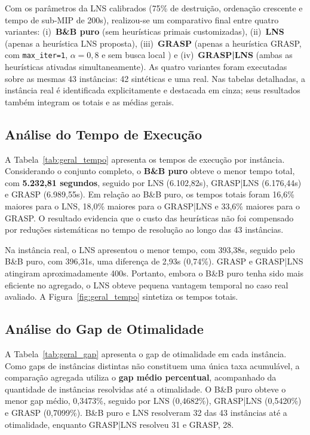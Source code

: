Com os parâmetros da LNS calibrados (75\% de destruição, ordenação crescente e tempo de sub-MIP de 200s), realizou-se um comparativo final entre quatro variantes: (i)~\textbf{B\&B puro} (sem heurísticas primais customizadas), (ii)~\textbf{LNS} (apenas a heurística LNS proposta), (iii)~\textbf{GRASP} (apenas a heurística GRASP, com \texttt{max\_iter=1}, $\alpha=0{,}8$ e sem busca local \cite{jhonatan_grasp_dpd}) e (iv)~\textbf{GRASP|LNS} (ambas as heurísticas ativadas simultaneamente). As quatro variantes foram executadas sobre as mesmas 43 instâncias: 42 sintéticas e uma real. Nas tabelas detalhadas, a instância real é identificada explicitamente e destacada em cinza; seus resultados também integram os totais e as médias gerais.

\subsection{Análise do Tempo de Execução}

A Tabela~\ref{tab:geral_tempo} apresenta os tempos de execução por instância. Considerando o conjunto completo, o \textbf{B\&B puro} obteve o menor tempo total, com \textbf{5.232,81 segundos}, seguido por LNS (6.102,82s), GRASP|LNS (6.176,44s) e GRASP (6.989,55s). Em relação ao B\&B puro, os tempos totais foram 16,6\% maiores para o LNS, 18,0\% maiores para o GRASP|LNS e 33,6\% maiores para o GRASP. O resultado evidencia que o custo das heurísticas não foi compensado por reduções sistemáticas no tempo de resolução ao longo das 43 instâncias.



Na instância real, o LNS apresentou o menor tempo, com 393,38s, seguido pelo B\&B puro, com 396,31s, uma diferença de 2,93s (0,74\%). GRASP e GRASP|LNS atingiram aproximadamente 400s. Portanto, embora o B\&B puro tenha sido mais eficiente no agregado, o LNS obteve pequena vantagem temporal no caso real avaliado. A Figura~\ref{fig:geral_tempo} sintetiza os tempos totais.



\subsection{Análise do Gap de Otimalidade}

A Tabela~\ref{tab:geral_gap} apresenta o gap de otimalidade em cada instância. Como gaps de instâncias distintas não constituem uma única taxa acumulável, a comparação agregada utiliza o \textbf{gap médio percentual}, acompanhado da quantidade de instâncias resolvidas até a otimalidade. O B\&B puro obteve o menor gap médio, 0,3473\%, seguido por LNS (0,4682\%), GRASP|LNS (0,5420\%) e GRASP (0,7099\%). B\&B puro e LNS resolveram 32 das 43 instâncias até a otimalidade, enquanto GRASP|LNS resolveu 31 e GRASP, 28.

